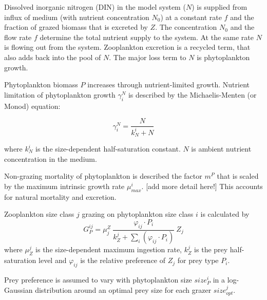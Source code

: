 \documentclass[journal abbreviation, manuscript]{copernicus}
\begin{document}
Dissolved inorganic nitrogen (DIN) in the model system ($N$) is supplied from influx of medium (with nutrient concentration $N_0$) at a constant rate $f$ and the fraction of grazed biomass that is excreted by $Z$. The concentration $N_0$ and the flow rate $f$ determine the total nutrient supply to the system. At the same rate $N$ is flowing out from the system. Zooplankton excretion is a recycled term, that also adds back into the pool of $N$. The major loss term to $N$ is phytoplankton growth.

Phytoplankton biomass $P$ increases through  nutrient-limited growth. Nutrient limitation of phytoplankton growth $\gamma_i^N$ is described by the Michaelis-Menten (or Monod) equation:

\begin{equation}
    \gamma_i^N =  \frac{N}{k_N^i + N} 
\end{equation}

where $k_N^i$ is the size-dependent half-saturation constant. $N$ is ambient nutrient concentration in the medium.

Non-grazing mortality of phytoplankton is described the factor $m^P$ that is scaled by the maximum intrinsic growth rate $\mu_{max}^i$. [add more detail here!] This accounts for natural mortality and excretion.

Zooplankton size class $j$ grazing on phytoplankton size class $i$ is calculated by
\begin{equation}
    G_P^{ij} = \mu_j^Z \ \frac{ \varphi_{ij} \cdot P_i }{ k_Z^j + \sum_{i}(\varphi_{ij} \cdot P_i) } \ Z_j
\end{equation}
where $\mu_Z^j$ is the size-dependent maximum ingestion rate, $k_Z^j$ is the prey half-saturation level and $\varphi_{ij}$ is the relative preference of $Z_j$ for prey type $P_i$.

Prey preference is assumed to vary with phytoplankton size $size_{P}^i$ in a log-Gaussian distribution around an optimal prey size for each grazer $size_{opt}^j$.
\end{document}
